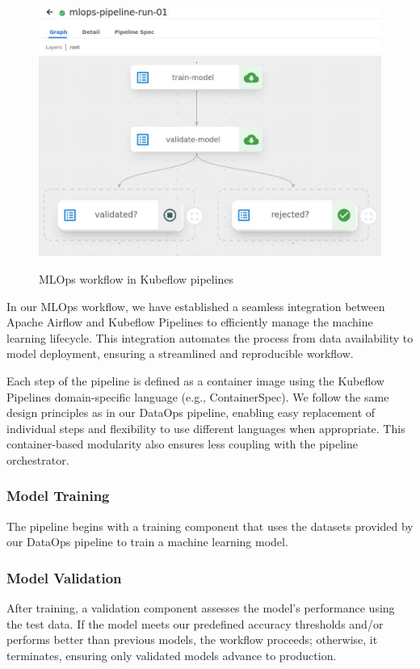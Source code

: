 \begin{figure}[!htbp]
    \centering
    \caption{MLOps workflow in Kubeflow pipelines}
    \includegraphics[scale=0.3]{images/project/mlops-workflow-kubeflow}
    \label{fig:mlops-workflow-kubeflow}
\end{figure}

In our MLOps workflow, we have established a seamless integration between Apache Airflow and Kubeflow Pipelines to
efficiently manage the machine learning lifecycle.
This integration automates the process from data availability to model deployment, ensuring a streamlined and reproducible workflow.

Each step of the pipeline is defined as a container image using the Kubeflow Pipelines domain-specific language (e.g., ContainerSpec).
We follow the same design principles as in our DataOps pipeline,
enabling easy replacement of individual steps and flexibility to use different languages when appropriate.
This container-based modularity also ensures less coupling with the pipeline orchestrator.

\subsubsection{Model Training}
The pipeline begins with a training component that uses the datasets provided by our DataOps pipeline to train a machine learning model.

\subsubsection{Model Validation}
After training, a validation component assesses the model's performance using the test data.
If the model meets our predefined accuracy thresholds and/or performs better than previous models,
the workflow proceeds; otherwise, it terminates, ensuring only validated models advance to production.

